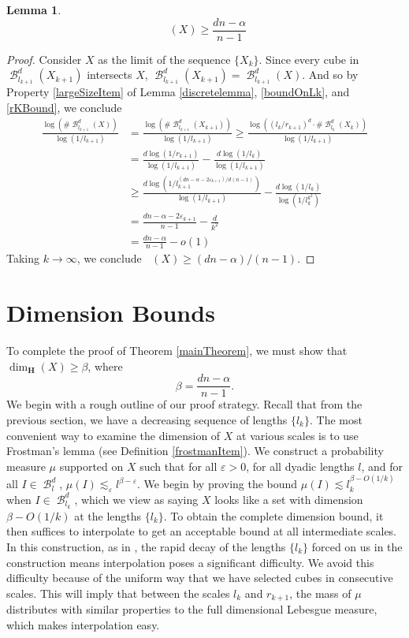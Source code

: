 \documentclass[dvipsnames,letterpaper,12pt]{article}
\numberwithin{equation}{section}
\theoremstyle{plain}
\newtheorem{lemma}{Lemma}
\DeclareMathOperator{\upminkdim}{\overline{\dim}_{\mathbf{M}}}
\DeclareMathOperator{\B}{\mathcal{B}}
\begin{document}
\begin{lemma}
	\[ \upminkdim(X) \geq \frac{dn - \alpha}{n - 1} \]
\end{lemma}
\begin{proof}
	Consider $X$ as the limit of the sequence $\{ X_k \}$. Since every cube in $\B^d_{l_{k+1}}(X_{k+1})$ intersects $X$, $\B^d_{l_{k+1}}(X_{k+1}) = \B^d_{l_{k+1}}(X)$. And so by Property \ref{largeSizeItem} of Lemma \ref{discretelemma}, \eqref{boundOnLk}, and \eqref{rKBound}, we conclude
	\begin{align*}
		\frac{\log(\# \B^d_{l_{k+1}}(X))}{\log(1/l_{k+1})} &= \frac{\log(\# \B^d_{l_{k+1}}(X_{k+1}))}{\log(1/l_{k+1})} \geq \frac{\log((l_k/r_{k+1})^d \cdot \# \B^d_{l_k}(X_k))}{\log(1/l_{k+1})}\\
		&= \frac{d \log(1/r_{k+1})}{\log(1/l_{k+1})} - \frac{d \log(1/l_k)}{\log(1/l_{k+1})}\\
		&\geq \frac{d \log \left(1/l_{k+1}^{(dn - \alpha - 2\varepsilon_{k+1})/d(n-1)} \right)}{\log(1/l_{k+1})} - \frac{d \log(1/l_k)}{\log(1/l_k^{k^2})}\\
		&= \frac{dn - \alpha - 2\varepsilon_{k+1}}{n-1} - \frac{d}{k^2}\\
		&= \frac{dn - \alpha}{n-1} - o(1)
	\end{align*}
	Taking $k \to \infty$, we conclude $\upminkdim(X) \geq (dn - \alpha)/(n-1)$.
\end{proof}







\section{Dimension Bounds}\label{dimensionsection}

To complete the proof of Theorem \ref{mainTheorem}, we must show that $\dim_{\mathbf{H}}(X) \geq \beta$, where
%
\[ \beta = \frac{dn - \alpha}{n - 1}. \]
%
We begin with a rough outline of our proof strategy. Recall that from the previous section, we have a decreasing sequence of lengths $\{ l_k \}$. The most convenient way to examine the dimension of $X$ at various scales is to use Frostman's lemma (see Definition \ref{frostmanItem}). We construct a probability measure $\mu$ supported on $X$ such that for all $\varepsilon > 0$, for all dyadic lengths $l$, and for all $I \in \B^d_l$, $\mu(I) \lesssim_\varepsilon l^{\beta - \varepsilon}$. We begin by proving the bound $\mu(I) \lesssim l_k^{\beta - O(1/k)}$ when $I \in \B^d_{l_k}$, which we view as saying $X$ looks like a set with dimension $\beta - O(1/k)$ at the lengths $\{ l_k \}$. To obtain the complete dimension bound, it then suffices to interpolate to get an acceptable bound at all intermediate scales. In this construction, as in \cite{MalabikaRob}, the rapid decay of the lengths $\{ l_k \}$ forced on us in the construction means interpolation poses a significant difficulty. We avoid this difficulty because of the uniform way that we have selected cubes in consecutive scales. This will imply that between the scales $l_k$ and $r_{k+1}$, the mass of $\mu$ distributes with similar properties to the full dimensional Lebesgue measure, which makes interpolation easy.
\end{document}
